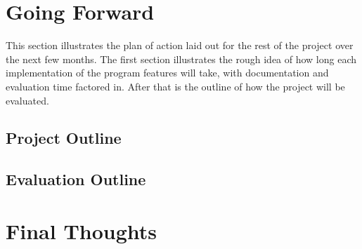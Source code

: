 \documentclass[11pt]{scrartcl}
\begin{document}

\section{Going Forward}
This section illustrates the plan of action laid out for the rest of the 
project over the next few months. The first section illustrates the rough
idea of how long each implementation of the program features will take, 
with documentation and evaluation time factored in. After that is the 
outline of how the project will be evaluated.

\subsection{Project Outline}

\subsection{Evaluation Outline}

\section{Final Thoughts}
\end{document}

